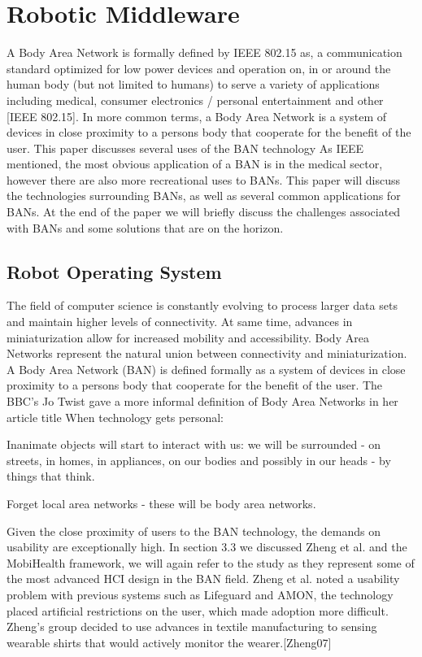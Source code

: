 \chapter{Robotic Middleware}

A Body Area Network is formally defined by IEEE 802.15 as, a communication standard optimized for low power devices and operation on, in or around the human body (but not limited to humans) to serve a variety of applications including medical, consumer electronics / personal entertainment and other [IEEE 802.15]. In more common terms, a Body Area Network is a system of devices in close proximity to a persons body that cooperate for the benefit of the user. This paper discusses several uses of the BAN technology As IEEE mentioned, the most obvious application of a BAN is in the medical sector, however there are also more recreational uses to BANs. This paper will discuss the technologies surrounding BANs, as well as several common applications for BANs. At the end of the paper we will briefly discuss the challenges associated with BANs and some solutions that are on the horizon.

\section{Robot Operating System}
The field of computer science is constantly evolving to process larger data sets and maintain higher levels of connectivity. At same time, advances in miniaturization allow for increased mobility and accessibility. Body Area Networks represent the natural union between connectivity and miniaturization. A Body Area Network (BAN) is defined formally as a system of devices in close proximity to a persons body that cooperate for the benefit of the user. The BBC's Jo Twist gave a more informal definition of Body Area Networks in her article title When technology gets personal:

Inanimate objects will start to interact with us: we will be surrounded - on streets, in homes, in appliances, on our bodies and possibly in our heads - by things that think.

Forget local area networks - these will be body area networks.

Given the close proximity of users to the BAN technology, the demands on usability are exceptionally high. In section 3.3 we discussed Zheng et al. and the MobiHealth framework, we will again refer to the study as they represent some of the most advanced HCI design in the BAN field. Zheng et al. noted a usability problem with previous systems such as Lifeguard and AMON, the technology placed artificial restrictions on the user, which made adoption more difficult. Zheng's group decided to use advances in textile manufacturing to sensing wearable shirts that would actively monitor the wearer.[Zheng07] 



